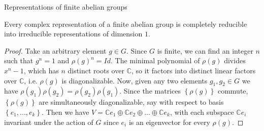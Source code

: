 \begin{frame}
\end{frame}

\begin{frame}{Representations of finite abelian groups}
\begin{theorem} Every complex representation of a finite abelian group is completely reducible into irreducible representations of dimension $1$.  
\end {theorem}
\pause
\begin{proof}
Take an arbitrary element $g \in G$.  Since $G$ is finite, we can find an integer $n$ such that $g^n = 1$ and $\rho(g)^n = Id$.    The minimal polynomial of $\rho(g)$ divides  $x^n -1$, which has $n$ distinct roots over $\mathbb{C}$, so it factors into distinct linear factors over $\mathbb{C}$,  i.e. $\rho(g)$ is diagonalizable.
Now, given any two elements $g_1, g_2 \in G$ we have $\rho(g_1)\rho(g_2)=\rho(g_2)\rho(g_1)$.
Since the matrices $\left\{ \rho(g)\right\}$ commute,  $\left\{ \rho(g)\right\}$ are simultaneously diagonalizable, say with respect to basis $\left\{ e_1, ..., e_k \right\}$.  Then we have $V= \mathbb{C}e_1 \oplus \mathbb{C} e_2 \oplus \ldots \oplus \mathbb{C} e_k$, with each subspace $ \mathbb{C}e_i$ invariant under the action of $G$ since $e_i$ is an eigenvector for every $\rho(g)$.
\end{proof}
\end{frame}

